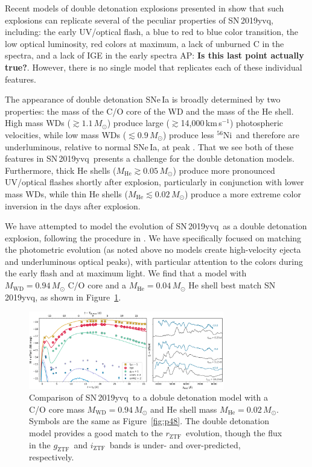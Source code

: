 \documentclass[twocolumn]{aastex63}
\newcommand{\abi}[1]{{\color{LincolnGreen} AP: \textbf{#1}}}
\newcommand{\rztf}{$r_\mathrm{ZTF}$}
\newcommand{\gztf}{$g_\mathrm{ZTF}$}
\newcommand{\iztf}{$i_\mathrm{ZTF}$}
\newcommand{\kms}{km\,s$^{-1}$}
\newcommand{\radni}{$^{56}$Ni}
\newcommand{\sn}{SN\,2019yvq}
\begin{document}
Recent models of double detonation explosions presented in \citet{Polin19}
show that such explosions can replicate several of the peculiar properties of
\sn, including: the early UV/optical flash, a blue to red to blue color
transition, the low optical luminosity, red colors at maximum, a lack of
unburned C in the spectra, and a lack of IGE in the early spectra \abi{Is
this last point actually true?}. However, there is no single model that
replicates each of these individual features.

The appearance of double detonation SNe\,Ia is broadly determined by two
properties: the mass of the C/O core of the WD and the mass of the He shell.
High mass WDs ($\gtrsim 1.1\,M_\odot$) produce large ($\gtrsim$14,000\,\kms)
photospheric velocities, while low mass WDs ($\lesssim 0.9\,M_\odot$) produce
less \radni\ and therefore are underluminous, relative to normal SNe\,Ia, at
peak \citep{Polin19}. That we see both of these features in \sn\ presents a
challenge for the \citet{Polin19} double detonation models. Furthermore,
thick He shells ($M_\mathrm{He} \gtrsim 0.05\,M_\odot$) produce more
pronounced UV/optical flashes shortly after explosion, particularly in
conjunction with lower mass WDs, while thin He shells ($M_\mathrm{He}
\lesssim 0.02\,M_\odot$) produce a more extreme color inversion in the days
after explosion.

We have attempted to model the evolution of \sn\ as a double detonation
explosion, following the procedure in \citet{Polin19}. We have specifically
focused on matching the photometric evolution (as noted above no models
create high-velocity ejecta and underluminous optical peaks), with particular
attention to the colors during the early flash and at maximum light. We find
that a model with $M_\mathrm{WD} = 0.94\,M_\odot$ C/O core and a
$M_\mathrm{He} = 0.04\,M_\odot$ He shell best match \sn, as shown in
Figure~\ref{fig:double_det}.

\begin{figure}
    \centering
    \includegraphics[width=3.35in]{./figures/double_det.pdf}
    \caption{Comparison of \sn\ to a dobule detonation model with a C/O core
    mass $M_\mathrm{WD} = 0.94\,M_\odot$ and He shell mass $M_\mathrm{He} =
    0.02\,M_\odot$. Symbols are the same as Figure~\ref{fig:p48}. The double
    detonation model provides a good match to the \rztf\ evolution, though
    the flux in the \gztf\ and \iztf\ bands is under- and over-predicted,
    respectively.}
    \label{fig:double_det}
\end{figure}
\end{document}
